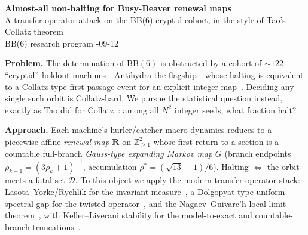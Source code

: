 \documentclass[10pt]{article}
\newcommand{\R}{\mathbf{R}}
\begin{document}
\begin{center}
{\large\bfseries Almost-all non-halting for Busy-Beaver renewal maps}\\[2pt]
{\small A transfer-operator attack on the BB(6) cryptid cohort, in the style of Tao's Collatz theorem}\\[2pt]
{\footnotesize BB(6) research program \quad\textbullet{}-09-12}
\end{center}
\vspace{-2pt}

\noindent\textbf{Problem.} The determination of $\mathrm{BB}(6)$ is obstructed
by a cohort of $\sim\!122$ ``cryptid'' holdout machines---Antihydra the
flagship---whose halting is equivalent to a Collatz-type first-passage event for
an explicit integer map~\cite{Aaronson2020,bbchallenge2024}. Deciding any single
such orbit is Collatz-hard. We pursue the statistical question instead, exactly
as Tao did for Collatz~\cite{Tao2022}: among all $N^2$ integer seeds, what
fraction halt?

\noindent\textbf{Approach.} Each machine's hurler/catcher macro-dynamics reduces
to a piecewise-affine \emph{renewal map} $\R$ on $\mathbb Z_{\ge1}^2$ whose
first return to a section is a countable full-branch \emph{Gauss-type expanding
Markov map} $G$ (branch endpoints $\rho_{k+1}=(3\rho_k+1)^{-1}$, accumulation
$\rho^\ast=(\sqrt{13}-1)/6$). Halting $\iff$ the orbit meets a fatal set $\mathcal D$.
To this object we apply the modern transfer-operator stack: Lasota--Yorke/Rychlik
for the invariant measure~\cite{LasotaYorke1973,Rychlik1983}, a Dolgopyat-type
uniform spectral gap for the twisted operator~\cite{Dolgopyat1998,Naud2005}, and
the Nagaev--Guivarc'h local limit theorem~\cite{HennionHerve2001,AaronsonDenker2001},
with Keller--Liverani stability for the model-to-exact and countable-branch
truncations~\cite{KellerLiverani1999}.
\end{document}
